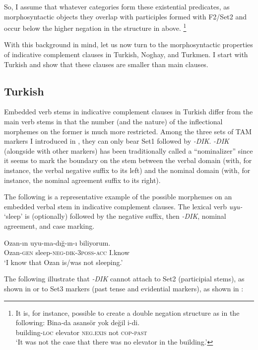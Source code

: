 \documentclass[output=paper]{langsci/langscibook}
\begin{document}
So, I assume that whatever categories form these existential predicates, as morphosyntactic objects they overlap with participles 
formed with F2/Set2 and occur below the higher negation in the structure in  above.%
\footnote{
    It is, for instance, possible to create a double negation structure as in the following:
    \ea
        \gll Bina-da asansör yok değil i-di.\\
        building-\textsc{loc} elevator \textsc{neg.exıs} not \textsc{cop}{}-\textsc{past}\\
        \glt `It was not the case that there was no elevator in the building.'
    \z
} 

With this background in mind, let us now turn to the morphosyntactic properties of indicative complement clauses in Turkish, Noghay, and Turkmen. 
I start with Turkish and show that these clauses are smaller than main clauses.

\subsection{Turkish}
\label{kelepirsec:key:2.2}

Embedded verb stems in indicative complement clauses in Turkish differ from the main verb stems in that the number 
(and the nature) of the inflectional morphemes on the former is much more restricted. 
Among the three sets of TAM markers I introduced in , they can only bear Set1 followed by \textit{-DIK}. 
\textit{-DIK} (alongside with other markers) has been traditionally called a ``nominalizer'' 
since it seems to mark the boundary on the stem between the verbal domain (with, for instance, the verbal negative suffix to its left) 
and the nominal domain (with, for instance, the nominal agreement suffix to its right). 

The following is a representative example of the possible morphemes on an embedded verbal stem in indicative complement clauses. 
The lexical verb \textit{uyu-} `sleep' is (optionally) followed by the negative suffix, then \textit{-DIK}, nominal agreement, and case marking.

\ea%
    \label{kelepirex:key:11}
    \gll Ozan-ın uyu-ma-dığ-ın-ı biliyorum.\\
    Ozan-\textsc{gen} sleep-\textsc{neg}{}-\textsc{dik}{}-\textsc{3poss}{}-\textsc{acc} I.know\\
    \glt   `I know that Ozan is/was not sleeping.'
    \z

The following illustrate that \textit{-DIK} cannot attach to Set2 (participial stems), as shown in  
or to Set3 markers (past tense and evidential markers), as shown in :
\end{document}
